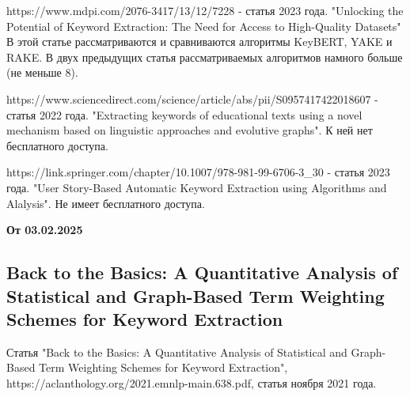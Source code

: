 \documentclass[bachelor, och, diploma ]{SCWorks}
\begin{document}
https://www.mdpi.com/2076-3417/13/12/7228 - статья 2023 года. "Unlocking the Potential of Keyword Extraction: The Need for Access to High-Quality Datasets"
В этой статье рассматриваются и сравниваются алгоритмы KeyBERT, YAKE и RAKE. В двух предыдущих статья рассматриваемых алгоритмов намного больше (не меньше 8).

https://www.sciencedirect.com/science/article/abs/pii/S0957417422018607 - статья 2022 года. 
"Extracting keywords of educational texts using a novel mechanism based on linguistic approaches and evolutive graphs".
К ней нет бесплатного доступа.

https://link.springer.com/chapter/10.1007/978-981-99-6706-3_30 - статья 2023 года. 
"User Story-Based Automatic Keyword Extraction using Algorithms and Alalysis". 
Не имеет бесплатного доступа.





\textbf{От 03.02.2025}
\subsection{Back to the Basics: A Quantitative Analysis of Statistical and Graph-Based Term Weighting Schemes for Keyword Extraction}
Статья "Back to the Basics: A Quantitative Analysis of Statistical and
Graph-Based Term Weighting Schemes for Keyword Extraction",
https://aclanthology.org/2021.emnlp-main.638.pdf, статья ноября 2021 года.






\conclusion
\end{document}
